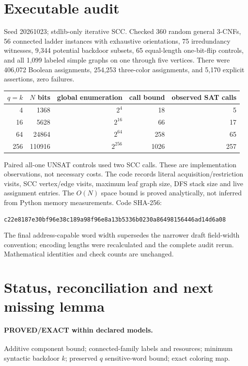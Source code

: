 \documentclass[11pt]{article}
\begin{document}
\section{Executable audit}
Seed 20261023; stdlib-only iterative SCC. Checked 360 random general 3-CNFs, 56 connected ladder instances with exhaustive orientations, 75 irredundancy witnesses, 9,344 potential backdoor subsets, 65 equal-length one-bit-flip controls, and all 1,099 labeled simple graphs on one through five vertices. There were 406,072 Boolean assignments, 254,253 three-color assignments, and 5,170 explicit assertions, zero failures.
\begin{center}
\begin{tabular}{rrrrr}
\toprule
$q=k$&$N$ bits&global enumeration&call bound&observed SAT calls\\
\midrule
4&1368&$2^4$&18&5\\
16&5628&$2^{16}$&66&17\\
64&24864&$2^{64}$&258&65\\
256&110916&$2^{256}$&1026&257\\
\bottomrule
\end{tabular}
\end{center}
Paired all-one UNSAT controls used two SCC calls. These are implementation observations, not necessary costs. The code records literal acquisition/restriction visits, SCC vertex/edge visits, maximum leaf graph size, DFS stack size and live assignment entries. The $O(N)$ space bound is proved analytically, not inferred from Python memory measurements. Code SHA-256:
\begin{center}\texttt{c22e8187e30bf96e38c189a98f96e8a13b5336b0230a86498156446ad14d6a08}\end{center}
The final address-capable word width supersedes the narrower draft field-width convention; encoding lengths were recalculated and the complete audit rerun. Mathematical identities and check counts are unchanged.

\section{Status, reconciliation and next missing lemma}
\paragraph{PROVED/EXACT within declared models.} Additive component bound; connected-family labels and resources; minimum syntactic backdoor $k$; preserved $q$ sensitive-word bound; exact coloring map.
\end{document}
